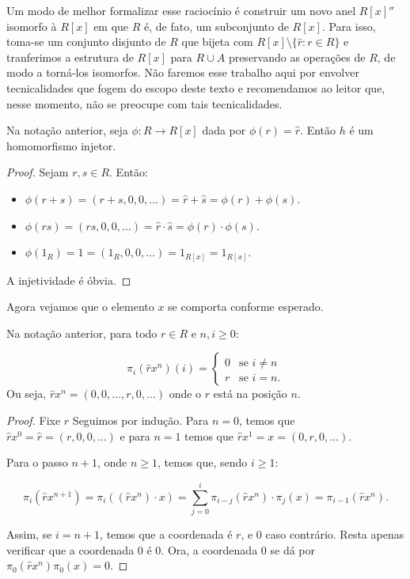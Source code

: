 Um modo de melhor formalizar esse raciocínio é construir um novo anel $R[x]''$ isomorfo à $R[x]$ em que $R$ é, de fato, um subconjunto de $R[x]$.
Para isso, toma-se um conjunto disjunto de $R$ que bijeta com $R[x]\setminus\{\hat r: r \in R\}$ e tranferimos a estrutura de $R[x]$ para $R\cup A$ preservando as operações de $R$, de modo a torná-los isomorfos.
Não faremos esse trabalho aqui por envolver tecnicalidades que fogem do escopo deste texto e recomendamos ao leitor que, nesse momento, não se preocupe com tais tecnicalidades.

\begin{lemma}
    Na notação anterior, seja $\phi:R\rightarrow R[x]$ dada por $\phi(r)=\hat r$. Então $h$ é um homomorfismo injetor.
\end{lemma}
    
\begin{proof}
    Sejam $r, s \in R$. Então:
    \begin{itemize}
        \item $\phi(r+s)=(r+s, 0, 0, \dots)=\hat r+\hat s=\phi(r)+\phi(s)$.
        \item $\phi(rs)=(rs, 0, 0, \dots)=\hat r\cdot \hat s=\phi(r)\cdot \phi(s)$.
        \item $\phi(1_R)=\hat 1=(1_R, 0, 0, \dots)=1_{R[x]}=1_{R[x]}$.
    \end{itemize}

    A injetividade é óbvia.
\end{proof}

Agora vejamos que o elemento $x$ se comporta conforme esperado.

\begin{lemma}
    Na notação anterior, para todo $r \in R$ e $n, i\geq 0$:

    $$\pi_i(\hat r x^n)(i)=\begin{cases}
        0 & \text{se } i\neq n\\
        r & \text{se } i=n.
    \end{cases}$$
    Ou seja, $\hat r x^n=(0, 0, \dots, r, 0, \dots)$ onde o $r$ está na posição $n$.
\end{lemma}

\begin{proof}
    Fixe $r$ Seguimos por indução. Para $n=0$, temos que $\hat rx^0=\hat r=(r, 0, 0, \dots)$ e para $n=1$ temos que $\hat r x^1=x=(0, r, 0, \dots)$.

    Para o passo $n+1$, onde $n\geq 1$, temos que, sendo $i\geq 1$:

    \[\pi_i(\hat rx^{n+1})=\pi_i((\hat rx^n)\cdot x)=\sum_{j=0}^i\pi_{i-j}(\hat r x^n)\cdot \pi_j(x)=\pi_{i-1}(\hat r x^n).\]

    Assim, se $i=n+1$, temos que a coordenada é $r$, e $0$ caso contrário. Resta apenas verificar que a coordenada $0$ é $0$. Ora, a coordenada $0$ se dá por $\pi_0(\hat r x^n)\pi_0(x)=0$.
\end{proof}

